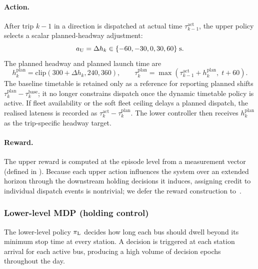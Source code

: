 \paragraph{Action.}
After trip $k-1$ in a direction is dispatched at actual time $\tau^{\mathrm{act}}_{k-1}$, the upper policy selects a scalar planned-headway adjustment:
\begin{equation}
  \label{eq:upper_action}
  a_{\mathrm{U}} = \Delta h_k \in \{-60,-30,0,30,60\}\;\text{s}.
\end{equation}
The planned headway and planned launch time are
\begin{equation}
  \label{eq:timetable_action}
  h^{\mathrm{plan}}_k =
  \mathrm{clip}(300 + \Delta h_k, 240, 360),\qquad
  \tau^{\mathrm{plan}}_k =
  \max(\tau^{\mathrm{act}}_{k-1}+h^{\mathrm{plan}}_k,\; t+60).
\end{equation}
The baseline timetable is retained only as a reference for reporting planned shifts $\tau^{\mathrm{plan}}_k-\tau^{\mathrm{base}}_k$; it no longer constrains dispatch once the dynamic timetable policy is active.
If fleet availability or the soft fleet ceiling delays a planned dispatch, the realised lateness is recorded as $\tau^{\mathrm{act}}_k-\tau^{\mathrm{plan}}_k$.
The lower controller then receives $h^{\mathrm{plan}}_k$ as the trip-specific headway target.

\paragraph{Reward.}
The upper reward is computed at the episode level from a measurement vector (defined in ).
Because each upper action influences the system over an extended horizon through the downstream holding decisions it induces, assigning credit to individual dispatch events is nontrivial; we defer the reward construction to~.

\subsubsection{Lower-level MDP (holding control)}
\label{sec:lower_mdp}

The lower-level policy $\pi_{\mathrm{L}}$ decides how long each bus should dwell beyond its minimum stop time at every station.
A decision is triggered at each station arrival for each active bus, producing a high volume of decision epochs throughout the day.

